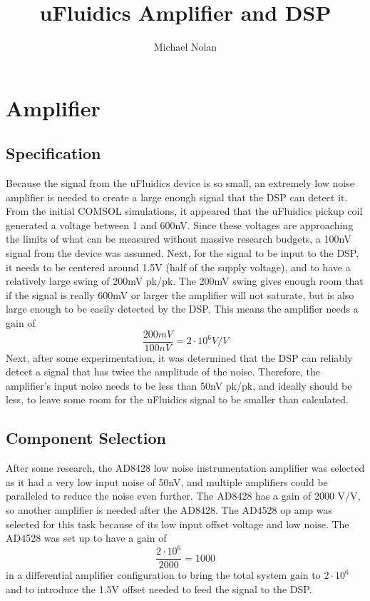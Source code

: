 \documentclass[10pt, journal]{IEEEtran}
\title{uFluidics Amplifier and DSP}
\author{Michael Nolan}
\begin{document}
\maketitle \par
\section{Amplifier}
\subsection{Specification}
Because the signal from the uFluidics device is so small, an extremely
low noise amplifier is needed to create a large enough signal that the
DSP can detect it. From the initial COMSOL simulations, it appeared
that the uFluidics pickup coil generated a voltage between 1 and
600nV. Since these voltages are approaching the limits of what can be
measured without massive research budgets, a 100nV signal from the
device was assumed. Next, for the signal to be input to the DSP, it
needs to be centered around 1.5V (half of the supply voltage), and to
have a relatively large swing of 200mV pk/pk. The 200mV swing gives
enough room that if the signal is really 600mV or larger the amplifier
will not saturate, but is also large enough to be easily detected by
the DSP. This means the amplifier needs a gain of
\begin{equation*}
  \frac{200mV}{100nV} = 2\cdot10^6V/V
\end{equation*}
Next, after some experimentation, it was determined that the DSP can
reliably detect a signal that has twice the amplitude of the
noise. Therefore, the amplifier's input noise needs to be less than
50nV pk/pk, and ideally should be less, to leave some room for the
uFluidics signal to be smaller than calculated.

\subsection{Component Selection}
After some research, the AD8428 low noise instrumentation amplifier
was selected as it had a very low input noise of 50nV, and multiple
amplifiers could be paralleled to reduce the noise even
further\cite{ad8428-parallel}. The AD8428 has a gain of 2000
V/V\cite{ad8428}, so another amplifier is needed after the AD8428. The
AD4528 op amp was selected for this task because of its low input
offset voltage and low noise. The AD4528 was set up to have a gain of
\begin{equation}
  \frac{2\cdot10^6}{2000} = 1000
\end{equation}
in a differential amplifier configuration to bring the total system
gain to $2\cdot10^6$ and to introduce the 1.5V offset needed to feed
the signal to the DSP.
\end{document}
